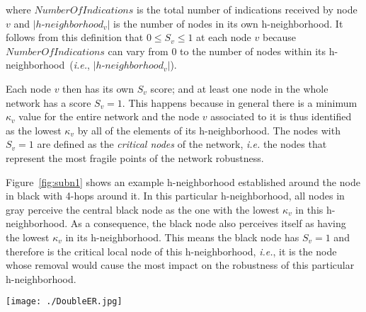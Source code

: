 \documentclass[conference,fleqn]{IEEEtran}
\begin{document}
\noindent
where $NumberOfIndications$ is the total number of indications received by node $v$ and $|h\text{-}neighborhood_v|$ is the number of nodes in its own 
h-neighborhood.
It follows from this definition that $0 \leq S_v \leq 1$ at each node $v$ because $NumberOfIndications$ can vary from $0$ to the number
of nodes within its h-neighborhood~(\textit{i.e.}, $|h\text{-}neighborhood_v|$).

\long{} 

Each node $v$ then has its own $S_v$ score; and 
at least one node in the whole network has a score $S_v = 1$.
This happens because in general there is  a minimum $\kappa_v$ value for the entire network and the node $v$ associated to it is 
thus identified as the lowest $\kappa_v$ by all of the
elements of its \mbox{h-neighborhood}. The nodes with $S_v = 1$ are defined as the \emph{critical nodes} of the network, \textit{i.e.}
the nodes that represent the most fragile points of the network robustness.

Figure~\ref{fig:subn1} shows an example h-neighborhood established around the node in black with 4-hops around it.
In this particular h-neighborhood, all nodes in gray perceive the central black node as the one with the lowest $\kappa_v$ in this
h-neighborhood. As a consequence, the black node also perceives itself as having the lowest $\kappa_v$ in its h-neighborhood. This
means the black node has $S_v = 1$ and therefore is the critical local node of this h-neighborhood, \textit{i.e.}, it is the node whose
removal would cause the most impact on the robustness of this particular h-neighborhood.  

\begin{figure*}[ht]
 \centering
 \texttt{[image: ./DoubleER.jpg]}
 \caption{h-neighborhood in which a node (in black) has $S_v = 1$.}
 \label{fig:subn1}
\end{figure*}
\end{document}
